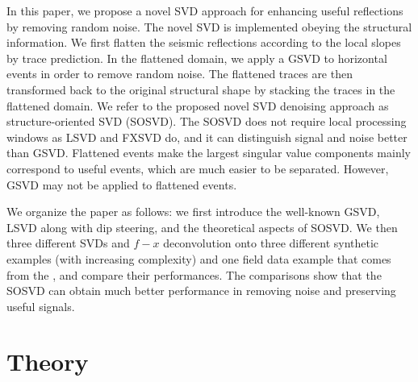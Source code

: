 In this paper, we propose a novel SVD approach for enhancing useful reflections by removing random noise. The novel SVD is implemented obeying the structural information.
We first flatten the seismic reflections according to the local slopes by trace prediction. In the flattened domain, we apply a GSVD to horizontal events in order to remove random noise. The flattened traces are then transformed back to the original structural shape by stacking the traces in the flattened domain. We refer to the proposed novel SVD denoising approach as structure-oriented SVD (SOSVD). The SOSVD does not require local processing windows as LSVD and FXSVD do, and it can distinguish signal and noise better than GSVD. Flattened events make the largest singular value components mainly correspond to useful events, which are much easier to be separated. However, GSVD may not be applied to flattened events. 

We organize the paper as follows: we first introduce the well-known GSVD, LSVD along with dip steering, and the theoretical aspects of SOSVD.  We then  three different SVDs and  $f-x$ deconvolution onto three different synthetic examples (with increasing complexity) and one field data example that comes from the , and compare their performances. The comparisons show that the SOSVD can obtain much better performance in removing noise and preserving useful signals. 

\section{Theory}
